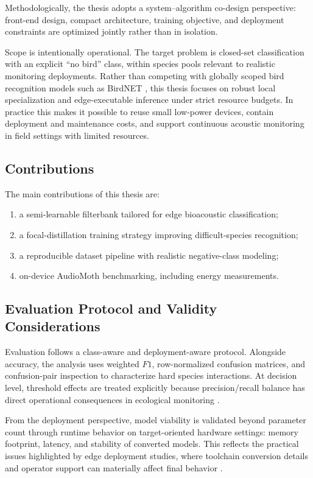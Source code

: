 \documentclass[a4paper,singleside,12pt]{report} %
\begin{document}
	Methodologically, the thesis adopts a system--algorithm co-design perspective: front-end design, compact architecture, training objective, and deployment constraints are optimized jointly rather than in isolation.

	Scope is intentionally operational. The target problem is closed-set classification with an explicit ``no bird'' class, within species pools relevant to realistic monitoring deployments. Rather than competing with globally scoped bird recognition models such as BirdNET \cite{birdnet2021}, this thesis focuses on robust local specialization and edge-executable inference under strict resource budgets. In practice this makes it possible to reuse small low-power devices, contain deployment and maintenance costs, and support continuous acoustic monitoring in field settings with limited resources.

	\subsection{Contributions}
	The main contributions of this thesis are:
	\begin{enumerate}
		\item a semi-learnable filterbank tailored for edge bioacoustic classification;
		\item a focal-distillation training strategy improving difficult-species recognition;
		\item a reproducible dataset pipeline with realistic negative-class modeling;
		\item on-device AudioMoth benchmarking, including energy measurements.
	\end{enumerate}

	\subsection{Evaluation Protocol and Validity Considerations}
	Evaluation follows a class-aware and deployment-aware protocol. Alongside accuracy, the analysis uses weighted \(F1\), row-normalized confusion matrices, and confusion-pair inspection to characterize hard species interactions. At decision level, threshold effects are treated explicitly because precision/recall balance has direct operational consequences in ecological monitoring \cite{perezgranados2023birdnet,stowell2019birdaudiodetection}.

	From the deployment perspective, model viability is validated beyond parameter count through runtime behavior on target-oriented hardware settings: memory footprint, latency, and stability of converted models. This reflects the practical issues highlighted by edge deployment studies, where toolchain conversion details and operator support can materially affect final behavior \cite{abadade2023tinymlsurvey,singh2023edgeaisurvey,zylinski2024deployment}.
\end{document}
